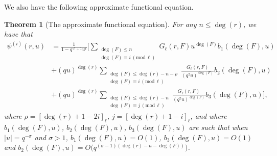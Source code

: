 \documentclass[12pt]{amsart}
\newtheorem{theorem}{Theorem}[section]
\renewcommand{\pmod}[1]{\,(\mathrm{mod}\,#1)}
\begin{document}
We also have the following approximate functional equation. 
\begin{theorem}[The approximate functional equation]
\label{afe}
For any $n \leq \deg(r)$, we have that
\begin{align*}
\psi^{(i)}(r,u) &= \frac{1}{1-q^{\ell+1} u^{\ell}} \Big[ \sum_{\substack{\deg(F) \leq n \\ \deg(F) \equiv i \pmod{\ell}}} G_\ell(r,F) u^{\deg(F)} b_1(\deg(F),u) \\
&+(qu)^{\deg(r)}  \sum_{\substack{\deg(F) \leq \deg(r)-n-\rho \\ \deg(F) \equiv i \pmod{\ell}}} \frac{G_\ell(r,F)}{(q^2u)^{\deg(F)}} b_2(\deg(F),u) \nonumber  \\
&+ (qu)^{\deg(r)}\sum_{\substack{\deg(F) \leq \deg(r)-n \\ \deg(F) \equiv j \pmod{\ell}}} \frac{G_\ell(r,F)}{(q^2u)^{\deg(F)}} b_3(\deg(F),u) \Big], \nonumber
\end{align*}
where $\rho = [\deg(r)+1-2i]_{\ell}$, $j=[\deg(r)+1-i]_{\ell}$, and
where $b_1(\deg(F),u)$, $b_2(\deg(F),u)$, $b_3(\deg(F),u)$ are such that when $|u|=q^{-\sigma}$ and $\sigma>1$, $b_1(\deg(F),u)= O(1)$, $b_3(\deg(F),u) =O(1)$ and $b_2(\deg(F),u) = O \Big( q^{(\sigma-1)( \deg(r) - n - \deg(F))}\Big)$.
\end{theorem}
\end{document}
